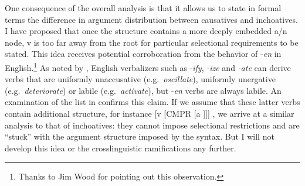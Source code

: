 \begin{exe}
\begin{xlist}
\begin{xlist}
\begin{exe}
\begin{exe}
\begin{xlist}
\begin{exe}
\begin{xlist}
\begin{exe}
\begin{xlist}
\begin{xlist}
\begin{exe}
\begin{xlist}
\begin{exe}
\begin{xlist}
\begin{exe}
\begin{xlist}
\begin{exe}
\begin{exe}
\begin{exe}
\begin{xlist}
\begin{exe}
\begin{exe}
\begin{xlist}
\begin{xlist}
\begin{exe}
\begin{xlist}
\begin{exe}
\begin{exe}
\begin{xlist}
\begin{exe}
\begin{exe}
\begin{xlist}
\begin{exe}
\begin{xlist}
\begin{exe}
\begin{xlist}
\begin{exe}
\begin{xlist}
\begin{exe}
\begin{exe}
\begin{xlist}
\begin{exe}
\begin{exe}
\begin{xlist}
\begin{xlist}
\begin{exe}
\begin{xlist}
\begin{xlist}
\begin{exe}
\begin{xlist}
\begin{exe}
\begin{xlist}
\begin{exe}
\begin{xlist}
\begin{exe}
\begin{xlist}
\begin{exe}
\begin{exe}
\begin{exe}
\begin{exe}
\begin{xlist}
\begin{exe}
\begin{exe}
\begin{xlist}
\begin{xlist}
One consequence of the overall analysis is that it allows us to state in formal terms the difference in argument distribution between causatives and inchoatives. 
I have proposed that once the structure contains a more deeply embedded a/n node, v is too far away from the root for particular selectional requirements to be stated. This idea receives potential corroboration from the behavior of -\emph{en} in English.\footnote{Thanks to Jim Wood for pointing out this observation.} As noted by \cite{harley09n}, English verbalizers such as -\emph{ify}, \emph{-ize} and \emph{-ate} can derive verbs that are uniformly unaccusative (e.g.~\emph{oscillate}), uniformly unergative (e.g.~\emph{deteriorate}) or labile (e.g.~\emph{activate}), but -\emph{en} verbs are always labile. An examination of the list in \citet[245]{levin93} confirms this claim. If we assume that these latter verbs contain additional structure, for instance [v [CMPR [a ]]] \citep{bobaljik12}, we arrive at a similar analysis to that of {\thif} inchoatives: they cannot impose selectional restrictions and are ``stuck'' with the argument structure imposed by the syntax. But I will not develop this idea or the crosslinguistic ramifications any further.


\end{xlist}
\end{xlist}
\end{exe}
\end{exe}
\end{xlist}
\end{exe}
\end{exe}
\end{exe}
\end{exe}
\end{xlist}
\end{exe}
\end{xlist}
\end{exe}
\end{xlist}
\end{exe}
\end{xlist}
\end{exe}
\end{xlist}
\end{xlist}
\end{exe}
\end{xlist}
\end{xlist}
\end{exe}
\end{exe}
\end{xlist}
\end{exe}
\end{exe}
\end{xlist}
\end{exe}
\end{xlist}
\end{exe}
\end{xlist}
\end{exe}
\end{xlist}
\end{exe}
\end{exe}
\end{xlist}
\end{exe}
\end{exe}
\end{xlist}
\end{exe}
\end{xlist}
\end{xlist}
\end{exe}
\end{exe}
\end{xlist}
\end{exe}
\end{exe}
\end{exe}
\end{xlist}
\end{exe}
\end{xlist}
\end{exe}
\end{xlist}
\end{exe}
\end{xlist}
\end{xlist}
\end{exe}
\end{xlist}
\end{exe}
\end{xlist}
\end{exe}
\end{exe}
\end{xlist}
\end{xlist}
\end{exe}
